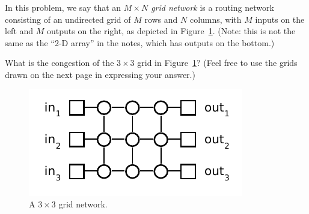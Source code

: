\documentclass[12pt,oneside]{article}
\begin{document}
\newpage
\begin{problem}{18}

    In this problem, we say that an \emph{$M \times N$ grid network} is a
    routing network consisting of an undirected grid of $M$ rows and $N$
    columns, with $M$ inputs on the left and $M$ outputs on the right, as
    depicted in Figure~\ref{3x3grid}. (Note: this is not the same as the ``2-D
    array'' in the notes, which has outputs on the bottom.)
    
\bparts

 What is the congestion of the $3 \times 3$ grid in
Figure~\ref{3x3grid}? (Feel free to use the grids drawn on the next page
in expressing your answer.)

\begin{figure}[h]
    \begin{center}\includegraphics{3x3grid.pdf}\end{center}
    \caption{A $3 \times 3$ grid network.}
    \label{3x3grid}
\end{figure}


\end{problem}
\end{document}
